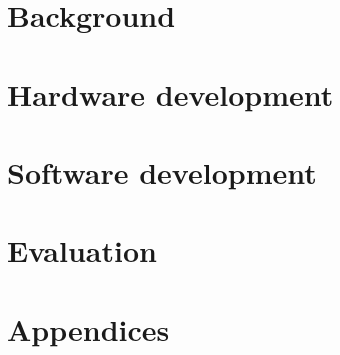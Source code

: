 \documentclass[11pt]{article}
\begin{document}



\part{Background}








\part{Hardware development}









\part{Software development}









\part{Evaluation}










\newpage
{}
\printbibliography

\appendix
\newpage
\part{Appendices}
\end{document}
